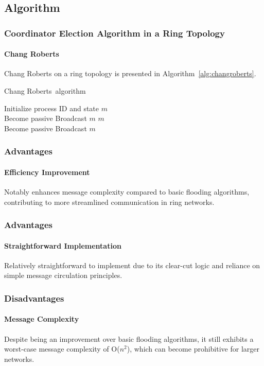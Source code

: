 \documentclass[11pt]{beamer}              %
\begin{document}
\subsection{Algorithm}

\begin{frame}
\frametitle{Coordinator Election Algorithm in a Ring Topology}
\framesubtitle{Chang Roberts}
Chang Roberts on a ring topology is presented in Algorithm~\ref{alg:changroberts}.
\begin{center}
    \begin{algorithm}[H]
        \scriptsize
        \def\algorithmlabel{Chang Roberts}
        \caption{\algorithmlabel\ algorithm}
        \label{alg:changroberts}
        \begin{algorithmic}[1]
            \State Initialize process ID and state
             { $m$ }
                \\
                 {Become passive}
                \State Broadcast $m$
             { $m$ }  
                \\
                 {Become passive}
                \State Broadcast $m$
        \end{algorithmic}
    \end{algorithm}
    \end{center}
    \end{frame}

\begin{frame}
\frametitle{Advantages}
\framesubtitle{Efficiency Improvement}
Notably enhances message complexity compared to basic flooding algorithms, contributing to more streamlined communication in ring networks.
\end{frame}

\begin{frame}
    \frametitle{Advantages}
    \framesubtitle{Straightforward Implementation}
    Relatively straightforward to implement due to its clear-cut logic and reliance on simple message circulation principles.
\end{frame}


\begin{frame}
    \frametitle{Disadvantages}
    \framesubtitle{Message Complexity}
    Despite being an improvement over basic flooding algorithms, it still exhibits a worst-case message complexity of O(\(n^2\)), which can become prohibitive for larger networks.
\end{frame}
\end{document}

